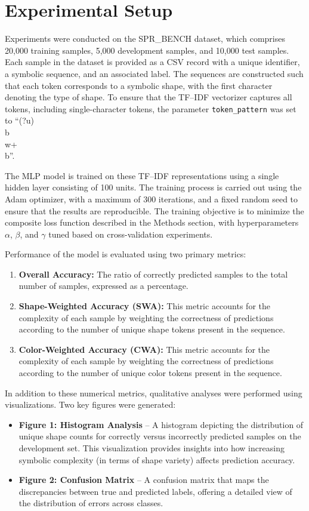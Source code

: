 \documentclass{article}
\begin{document}
\section{Experimental Setup}
Experiments were conducted on the SPR\_BENCH dataset, which comprises 20,000 training samples, 5,000 development samples, and 10,000 test samples. Each sample in the dataset is provided as a CSV record with a unique identifier, a symbolic sequence, and an associated label. The sequences are constructed such that each token corresponds to a symbolic shape, with the first character denoting the type of shape. To ensure that the TF–IDF vectorizer captures all tokens, including single-character tokens, the parameter \texttt{token\_pattern} was set to ``(?u)\\b\\w+\\b''.

The MLP model is trained on these TF–IDF representations using a single hidden layer consisting of 100 units. The training process is carried out using the Adam optimizer, with a maximum of 300 iterations, and a fixed random seed to ensure that the results are reproducible. The training objective is to minimize the composite loss function described in the Methods section, with hyperparameters \(\alpha\), \(\beta\), and \(\gamma\) tuned based on cross-validation experiments.

Performance of the model is evaluated using two primary metrics:
\begin{enumerate}
    \item \textbf{Overall Accuracy:} The ratio of correctly predicted samples to the total number of samples, expressed as a percentage.
    \item \textbf{Shape-Weighted Accuracy (SWA):} This metric accounts for the complexity of each sample by weighting the correctness of predictions according to the number of unique shape tokens present in the sequence. 
    \item \textbf{Color-Weighted Accuracy (CWA):} This metric accounts for the complexity of each sample by weighting the correctness of predictions according to the number of unique color tokens present in the sequence. 
\end{enumerate}

In addition to these numerical metrics, qualitative analyses were performed using visualizations. Two key figures were generated:
\begin{itemize}
    \item \textbf{Figure 1: Histogram Analysis} – A histogram depicting the distribution of unique shape counts for correctly versus incorrectly predicted samples on the development set. This visualization provides insights into how increasing symbolic complexity (in terms of shape variety) affects prediction accuracy.
    \item \textbf{Figure 2: Confusion Matrix} – A confusion matrix that maps the discrepancies between true and predicted labels, offering a detailed view of the distribution of errors across classes.
\end{itemize}
\end{document}
